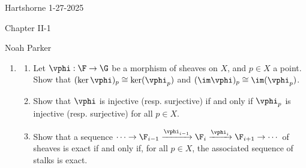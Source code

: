 \documentclass[12pt]{amsart}
\begin{document}
{Hartshorne} \hfill {1-27-2025}

\bigskip\bigskip

\begin{center}

{\sc Chapter II-1}

\end{center}

\begin{center}

  {Noah Parker} %
    
\end{center}

\bigskip

% 

\begin{enumerate}
	\item[2.] {
      \begin{enumerate}
        \item Let $\vphi:\F\to \G$ be a morphism of sheaves on $X$, and $p\in X$ a point.
          Show that $(\ker\vphi)_p\cong \ker(\vphi_p)$ and $(\im\vphi)_p\cong \im(\vphi_p)$.
        \item Show that $\vphi$ is injective (resp. surjective) if and only if $\vphi_p$ is injective (resp. surjective) for all $p\in X$.
        \item Show that a sequence $\cdots\to \F_{i-1}\xrightarrow{\vphi_{i-1}}\F_i\xrightarrow{\vphi_i}\F_{i+1}\to \cdots$ of sheaves is exact if and only if, for all $p\in X$, the associated sequence of stalks is exact.
      \end{enumerate}
    }
\end{enumerate}
\end{document}
